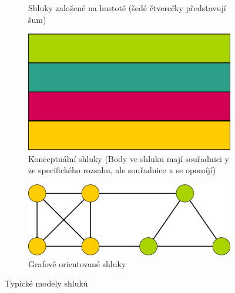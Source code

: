 \begin{figure}[h]
\begin{subfigure}{.49\textwidth}
  \caption{Shluky založené na hustotě (šedé čtverečky představují šum)}
  \label{fig:densityClusters}
\end{subfigure}
\vspace*{0.5cm} 
\begin{subfigure}{.49\textwidth}
  \centering
  \includegraphics[width=.5\linewidth]{img/conceptualClusters.eps}
  \caption{Konceptuální shluky (Body ve shluku mají souřadnici y ze specifického rozsahu, ale souřadnice x se opomíjí)}
  \label{fig:conceptualClusters}
\end{subfigure}
\begin{subfigure}{.49\textwidth}
  \centering
  \includegraphics[width=.5\linewidth]{img/graphClusters.eps}
  \caption{Grafově orientované shluky}
  \label{fig:graphClusters}
\end{subfigure}
\caption{Typické modely shluků}
\end{figure}

